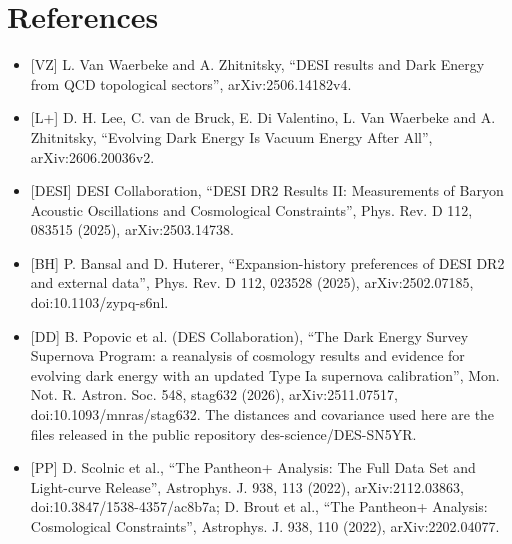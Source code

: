 \documentclass[11pt,a4paper]{article}
\begin{document}
\section*{References}
\begin{itemize}
\item{} [VZ] L. Van Waerbeke and A. Zhitnitsky, ``DESI results and Dark Energy from QCD topological sectors'',
arXiv:2506.14182v4.
\item{} [L+] D. H. Lee, C. van de Bruck, E. Di Valentino, L. Van Waerbeke and A. Zhitnitsky, ``Evolving Dark Energy Is
Vacuum Energy After All'', arXiv:2606.20036v2.
\item{} [DESI] DESI Collaboration, ``DESI DR2 Results II: Measurements of Baryon Acoustic Oscillations and Cosmological
Constraints'', Phys. Rev. D 112, 083515 (2025), arXiv:2503.14738.
\item{} [BH] P. Bansal and D. Huterer, ``Expansion-history preferences of DESI DR2 and external data'', Phys. Rev. D 112,
023528 (2025), arXiv:2502.07185, doi:10.1103/zypq-s6nl.
\item{} [DD] B. Popovic et al. (DES Collaboration), ``The Dark Energy Survey Supernova Program: a reanalysis of cosmology
results and evidence for evolving dark energy with an updated Type Ia supernova calibration'', Mon. Not. R. Astron.
Soc. 548, stag632 (2026), arXiv:2511.07517, doi:10.1093/mnras/stag632. The distances and covariance used here are
the files released in the public repository des-science/DES-SN5YR.
\item{} [PP] D. Scolnic et al., ``The Pantheon+ Analysis: The Full Data Set and Light-curve Release'', Astrophys. J. 938, 113
(2022), arXiv:2112.03863, doi:10.3847/1538-4357/ac8b7a; D. Brout et al., ``The Pantheon+ Analysis: Cosmological
Constraints'', Astrophys. J. 938, 110 (2022), arXiv:2202.04077.
\end{itemize}
\end{document}
